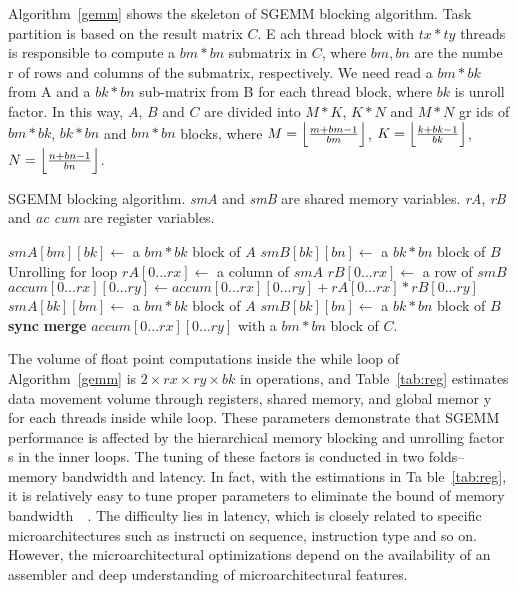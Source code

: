 Algorithm~\ref{gemm} shows the skeleton of SGEMM blocking algorithm. Task partition is based on the result matrix $C$. E
ach thread block with $tx*ty$ threads is responsible to compute a $bm*bn$ submatrix in $C$, where $bm, bn$ are the numbe
r of rows and columns of the submatrix, respectively. We need read a $bm*bk$ from A and a $bk*bn$ sub-matrix from B for 
each thread block, where $bk$ is unroll factor. In this way, $A$, $B$ and $C$ are divided into $M*K$, $K*N$ and $M*N$ gr
ids of $bm*bk$, $bk*bn$ and $bm*bn$ blocks, where $M=\Bigl\lfloor \frac{m+bm-1}{bm} \Bigr\rfloor$, $K=\Bigl\lfloor \frac
{k+bk-1}{bk} \Bigr\rfloor$, $N=\Bigl\lfloor \frac{n+bn-1}{bn} \Bigr\rfloor$.

\begin{algorithm}
  \caption{SGEMM blocking algorithm. {\em smA} and {\em smB} are shared memory variables. {\em rA}, {\em rB} and {\em ac
cum} are register variables.}\label{gemm}
  \begin{algorithmic}[1]
	\State $smA[bm][bk] \gets$ a $bm * bk$ block of $A$
	\State $smB[bk][bn] \gets$ a $bk * bn$ block of $B$
	\Do
	 \Comment Unrolling for loop
	\State $rA[0...rx]\gets$ a column of $smA$
	\State $rB[0...rx]\gets$ a row of $smB$
	\State $accum[0...rx][0...ry]\gets accum[0...rx][0...ry]+rA[0...rx]*rB[0...ry]$
	\EndFor
	\State $smA[bk][bm]\gets$ a $bm*bk$ block of $A$
	\State $smB[bk][bn]\gets$ a $bk*bn$ block of $B$
	\State \textbf{sync}
	\State \textbf{merge} $accum[0...rx][0...ry]$ with a $bm*bn$ block of $C$.
  \end{algorithmic}
\end{algorithm}

The volume of float point computations inside the while loop of Algorithm~\ref{gemm} is $2\times rx\times ry \times bk$ 
in operations, and Table~\ref{tab:reg} estimates data movement volume through registers, shared memory, and global memor
y for each threads inside while loop.
These parameters demonstrate that SGEMM performance is affected by the hierarchical memory blocking and unrolling factor
s in the inner loops.
The tuning of these factors is conducted in two folds--memory bandwidth and latency. In fact, with the estimations in Ta
ble~\ref{tab:reg}, it is relatively easy to tune proper parameters to eliminate the bound of memory bandwidth~\cite{magm
a}~\cite{tan}. The difficulty lies in latency, which is closely related to specific microarchitectures such as instructi
on sequence, instruction type and so on. However, the microarchitectural optimizations depend on the availability of an 
assembler and deep understanding of microarchitectural features. %

